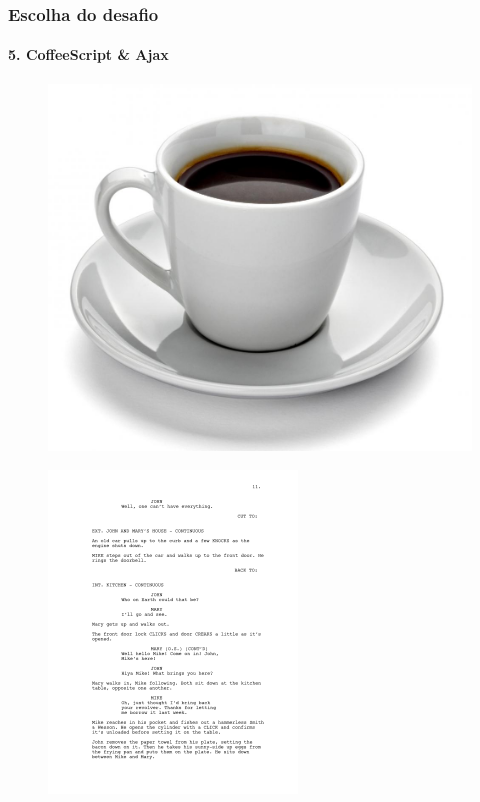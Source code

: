 \documentclass{beamer}
\begin{document}
\begin{frame}
	\frametitle{Escolha do desafio}
  \framesubtitle{5. CoffeeScript \& Ajax}

  \begin{multicols}{3}
    \begin{figure}[htb]
      \begin{center}
        \includegraphics[scale=0.04]{coffee.jpg}
      \end{center}
    \end{figure}

    \columnbreak

    \begin{figure}[htb]
      \begin{center}
        \includegraphics[scale=0.13]{script.png}
      \end{center}
    \end{figure}


\end{multicols}
\end{frame}
\end{document}
